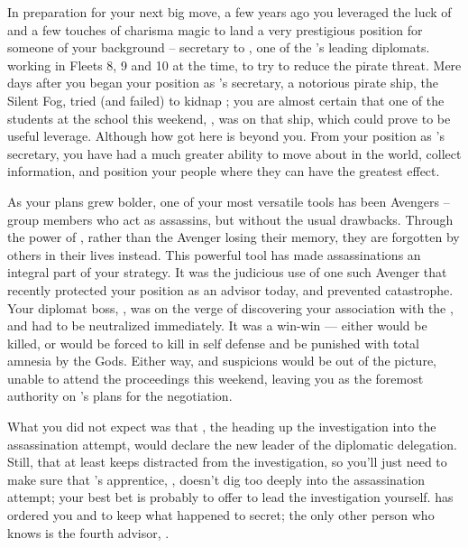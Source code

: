 \documentclass[char]{GL2020}
\begin{document}
In preparation for your next big move, a few years ago you leveraged the luck of \cGenesis{} and a few touches of charisma magic to land a very prestigious position for someone of your background -- secretary to \cHeadDiplomat{\full}, one of the \pShip{}'s leading diplomats. \cHeadDiplomat{\They} \cHeadDiplomat{\were} working in Fleets 8, 9 and 10 at the time, to try to reduce the pirate threat. Mere days after you began your position as \cHeadDiplomat{}'s secretary, a notorious pirate ship, the Silent Fog, tried (and failed) to kidnap \cHeadDiplomat{\them}; you are almost certain that one of the students at the school this weekend, \cPirateChild{\full}, was on that ship, which could prove to be useful leverage. Although how \cPirateChild{\they} got here is beyond you. From your position as \cHeadDiplomat{}'s secretary, you have had a much greater ability to move about in the world, collect information, and position your people where they can have the greatest effect. 

As your plans grew bolder, one of your most versatile tools has been Avengers -- group members who act as assassins, but without the usual drawbacks. Through the power of \cGenesis{}, rather than the Avenger losing their memory, they are forgotten by others in their lives instead. This powerful tool has made assassinations an integral part of your strategy. It was the judicious use of one such Avenger that recently protected your position as an advisor \pSc{} today, and prevented catastrophe. Your diplomat boss, \cHeadDiplomat{}, was on the verge of discovering your association with the \pGoaties{}, and had to be neutralized immediately. It was a win-win — either \cHeadDiplomat{} would be killed, or \cHeadDiplomat{\they} would be forced to kill in self defense and be punished with total amnesia by the Gods. Either way, \cHeadDiplomat{\they} and \cHeadDiplomat{\their} suspicions would be out of the picture, unable to attend the proceedings this weekend, leaving you as the foremost authority on \cHeadDiplomat{}'s plans for the negotiation. 

What you did not expect was that \cEbbPriest{\full}, the  \cEbbPriest{\cleric} heading up the investigation into the assassination attempt, would declare \cEbbPriest{\themself} the new leader of the \pShip{} diplomatic delegation. Still, that at least keeps \cEbbPriest{\them} distracted from the investigation, so you'll just need to make sure that \cHeadDiplomat{}'s apprentice, \cJuniorStatesman{\full}, doesn't dig too deeply into the assassination attempt; your best bet is probably to offer to lead the investigation yourself. \cEbbPriest{} has ordered you and \cJuniorStatesman{} to keep what happened to \cHeadDiplomat{} secret; the only other person who knows is the fourth \pShip{} advisor, \cBunker{\full}.
 
\end{document}
